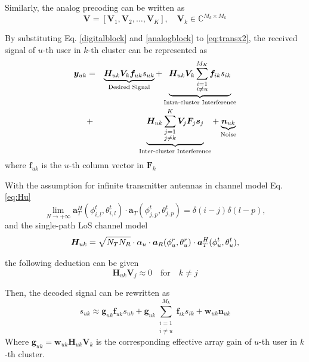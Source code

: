 \documentclass[conference]{IEEEtran}
\begin{document}
Similarly, the analog precoding can be written as
\begin{equation}\label{analogblock}
	\bm{V} = [\bm{V}_1, \bm{V}_2, \dots, \bm{V}_K],\quad \bm{V}_k\in \mathbb{C}^{M_k\times M_k}
\end{equation}

By substituting Eq. \eqref{digitalblock} and \eqref{analogblock} to \eqref{eq:transx2},  the received signal of $u$-th user in $k$-th cluster can be represented as
\begin{eqnarray}{\label{eq:rewrite2}}
{\bm y}_{uk} &=&\underbrace{\bm{H}_{uk} \bm{V}_k\bm{f}_{uk}{s}_{uk}}_\text{Desired Signal}+\underbrace{\bm{H}_{uk} \bm{V}_k\sum_{\substack{i=1 \\ i\neq u}}^{M_K}\bm{f}_{ik}s_{ik}}_\text{Intra-cluster Interference} \nonumber\\
&+& \underbrace{\bm{H}_{uk}\sum_{\substack{j=1\\j\neq k}}^{K}\bm{V}_j\bm{F}_j\bm{s}_j }_\text{Inter-cluster Interference}+ \underbrace{\bm{n}_{uk}}_\text{Noise}
\end{eqnarray}
where $\bm{f}_{uk}$ is the $u$-th column vector in $\bm{F}_k$

With the assumption for infinite transmitter antennas in channel model Eq. \eqref{eq:Hu}
\begin{equation}
\lim_{N\rightarrow +\infty} \bm{a}^H_{T}(\phi^t_{i,l},\theta^t_{i,l}) \cdot\bm{a}_{T}(\phi^t_{j,p},\theta^t_{j,p})=\delta(i-j)\delta(l-p),
\end{equation}
and the single-path LoS channel model
\begin{equation}{\label{eq:HuLu1}}
\bm{H}_{uk} = \sqrt{N_{T}N_{R}}\cdot\alpha_u \cdot\bm{a}_{R}(\phi^r_{u},\theta^r_{u})\cdot\bm{a}^{H}_{T}(\phi^t_{u},\theta^t_{u}),
\end{equation}

the following deduction can be given
\begin{equation}\label{approx}
	\bm{H}_{uk}\bm{V}_{j} \approx 0 \quad \text{for} \quad k \neq j
\end{equation}

Then, the decoded signal can be rewritten as
\begin{equation}\label{Eq:receivedsignal}
	s_{uk} \approx \bm{g}_{uk}\bm{f}_{uk}s_{uk} + \bm{g}_{uk}\sum_{\substack{i=1\\i\neq u}}^{M_k}\bm{f}_{ik}s_{ik}+\bm{w}_{uk}\bm{n}_{uk}
\end{equation}
Where $\bm{g}_{uk} = \bm{w}_{uk}\bm{H}_{uk}\bm{V}_k$ is the corresponding effective array gain of $u$-th user in $k$-th cluster.
\end{document}
